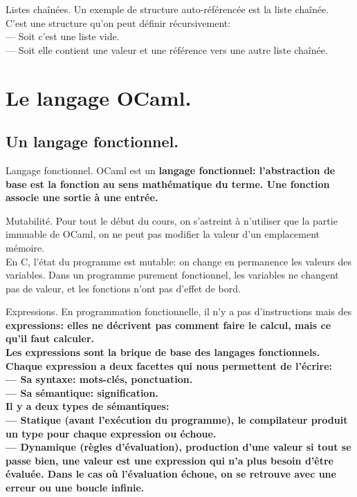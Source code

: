 \documentclass[french, 11pt]{article}
\begin{document}
\begin{ex}{Listes chaînées.}{}
    Un exemple de structure auto-référencée est la liste chaînée.\\
    C'est une structure qu'on peut définir récursivement:\\
    --- Soit c'est une liste vide.\\
    --- Soit elle contient une valeur et une référence vers une autre liste chaînée.
\end{ex}

\section{Le langage OCaml.}

\subsection{Un langage fonctionnel.}

\begin{defi}{Langage fonctionnel.}{}
    OCaml est un \bf{langage fonctionnel}: l'abstraction de base est la fonction au sens mathématique du terme. Une fonction associe une sortie à une entrée.
\end{defi}

\begin{defi}{Mutabilité.}{}
    Pour tout le début du cours, on s'astreint à n'utiliser que la partie immuable de OCaml, on ne peut pas modifier la valeur d'un emplacement mémoire.\\
    En C, l'état du programme est mutable: on change en permanence les valeurs des variables.\n
    Dans un programme purement fonctionnel, les variables ne changent pas de valeur, et les fonctions n'ont pas d'effet de bord.
\end{defi}

\begin{defi}{Expressions.}{}
    En programmation fonctionnelle, il n'y a pas d'instructions mais des \bf{expressions}: elles ne décrivent pas comment faire le calcul, mais ce qu'il faut calculer.\\
    Les expressions sont la brique de base des langages fonctionnels. Chaque expression a deux facettes qui nous permettent de l'écrire:\\
    --- Sa syntaxe: mots-clés, ponctuation.\\
    --- Sa sémantique: signification.\\
    Il y a deux types de sémantiques:\\
    --- Statique (avant l'exécution du programme), le compilateur produit un type pour chaque expression ou échoue.\\
    --- Dynamique (règles d'évaluation), production d'une valeur si tout se passe bien, une valeur est une expression qui n'a plus besoin d'être évaluée.\n
    Dans le cas où l'évaluation échoue, on se retrouve avec une erreur ou une boucle infinie.
\end{defi}
\end{document}
